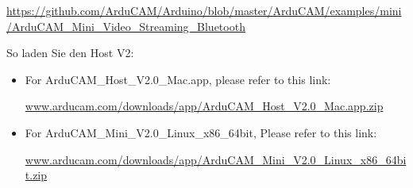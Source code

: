 \url{https://github.com/ArduCAM/Arduino/blob/master/ArduCAM/examples/mini/ArduCAM_Mini_Video_Streaming_Bluetooth}

So laden Sie den Host V2:

{

\begin{itemize}
  \item For ArduCAM\_Host\_V2.0\_Mac.app, please refer to this link:
  
         \url{www.arducam.com/downloads/app/ArduCAM_Host_V2.0_Mac.app.zip}
  \item For ArduCAM\_Mini\_V2.0\_Linux\_x86\_64bit, Please refer to this link:
       
       \url{www.arducam.com/downloads/app/ArduCAM_Mini_V2.0_Linux_x86_64bit.zip}
\end{itemize}

}
